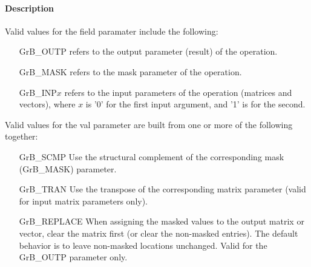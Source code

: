 \paragraph{Description}

Valid values for the {\sf field} paramater include the following:

\begin{itemize}[leftmargin=1.5in]
\item[{\sf GrB\_OUTP}]   refers to the output parameter (result) of the operation.
\item[{\sf GrB\_MASK}]   refers to the mask parameter of the operation.
\item[{\sf GrB\_INP}$x$] refers to the input parameters of the operation 
                         (matrices and vectors), where $x$ is '0' for the first input argument, and '1' is for the second.
\end{itemize}

Valid values for the {\sf val} parameter are built from one or
more of the following together:

\begin{itemize}[leftmargin=1.5in]
\item[{\sf GrB\_SCMP}]    Use the structural complement of the corresponding mask
                          (GrB\_MASK) parameter.
\item[{\sf GrB\_TRAN}]    Use the transpose of the corresponding matrix parameter
                          (valid for input matrix parameters only).
\item[{\sf GrB\_REPLACE}] When assigning the masked values to the output matrix
                          or vector, clear the matrix first (or clear the
                          non-masked entries).  The default behavior is to leave
                          non-masked locations unchanged.  Valid for the
                          {\sf GrB\_OUTP} parameter only.
\end{itemize}

 



